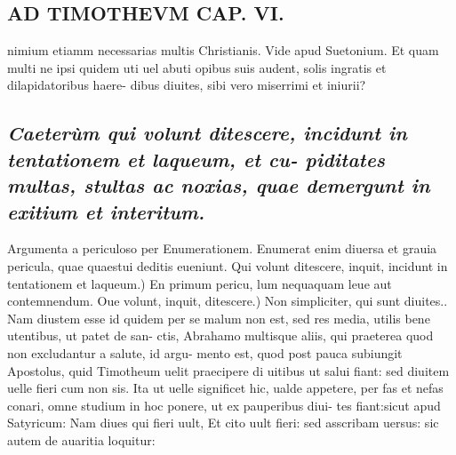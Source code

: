 \documentclass{article}
\begin{document}
\begin{pages}
\section*{AD TIMOTHEVM CAP. VI. }
\marginpar{[ p.125 ]}\pstart nimium etiamm necessarias multis Christianis. Vide apud Suetonium. Et quam multi ne ipsi quidem uti uel abuti opibus suis audent, solis ingratis et dilapidatoribus haere- dibus diuites, sibi vero miserrimi et iniurii?  \pend
{}
{}
\subsection*{\textit{Caeterùm qui volunt ditescere, incidunt in tentationem et laqueum, et cu- piditates multas, stultas ac noxias, quae demergunt in exitium et interitum. }}\pstart Argumenta a periculoso per Enumerationem. Enumerat enim diuersa et grauia pericula, quae quaestui deditis eueniunt.  \pend\pstart Qui volunt ditescere, inquit, incidunt in tentationem et laqueum.) En primum pericu, lum nequaquam leue aut contemnendum.  \pend\pstart Oue volunt, inquit, ditescere.) Non simpliciter, qui sunt diuites.. Nam diustem esse id quidem per se malum non est, sed res media, utilis bene utentibus, ut patet de san- ctis, Abrahamo multisque aliis, qui praeterea quod non excludantur a salute, id argu- mento est, quod post pauca subiungit Apostolus, quid Timotheum uelit praecipere di uitibus ut salui fiant: sed diuitem uelle fieri cum non sis. Ita ut uelle significet hic, ualde appetere, per fas et nefas conari, omne studium in hoc ponere, ut ex pauperibus diui- tes fiant:sicut apud Satyricum: Nam diues qui fieri uult, Et cito uult fieri: sed asscribam uersus: sic autem de auaritia loquitur:  \pend
{}
{}

\end{pages}
\end{document}
